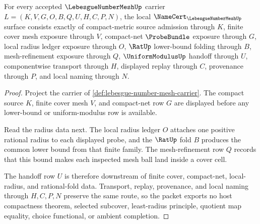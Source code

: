\begin{theorem}
\label{thm:lebesgue-number-mesh-namecert-obligations}
For every accepted $\LebesgueNumberMeshUp$ carrier $L=(K,V,G,O,B,Q,U,H,C,P,N)$, the local $\NameCert_{\LebesgueNumberMeshUp}$ surface consists exactly of compact-metric source admission through $K$, finite cover mesh exposure through $V$, compact-net $\ProbeBundle$ exposure through $G$, local radius ledger exposure through $O$, $\RatUp$ lower-bound folding through $B$, mesh-refinement exposure through $Q$, $\UniformModulusUp$ handoff through $U$, componentwise transport through $H$, displayed replay through $C$, provenance through $P$, and local naming through $N$.
\end{theorem}
\begin{proof}
Project the carrier of \autoref{def:lebesgue-number-mesh-carrier}. The compact source $K$, finite cover mesh $V$, and compact-net row $G$ are displayed before any lower-bound or uniform-modulus row is available.

Read the radius data next. The local radius ledger $O$ attaches one positive rational radius to each displayed probe, and the $\RatUp$ fold $B$ produces the common lower bound from that finite family. The mesh-refinement row $Q$ records that this bound makes each inspected mesh ball land inside a cover cell.

The handoff row $U$ is therefore downstream of finite cover, compact-net, local-radius, and rational-fold data. Transport, replay, provenance, and local naming through $H,C,P,N$ preserve the same route, so the packet exports no host compactness theorem, selected subcover, least-radius principle, quotient map equality, choice functional, or ambient completion.
\end{proof}

